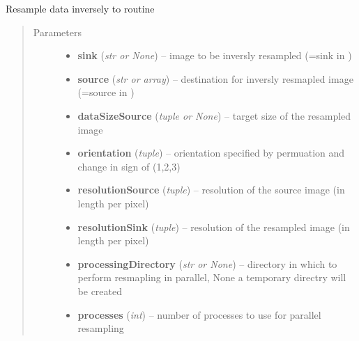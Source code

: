 \documentclass[letterpaper,10pt,english]{sphinxmanual}
\begin{document}
\begin{fulllineitems}
\label{api/ClearMap.Alignment:ClearMap.Alignment.Resampling.resampleDataInverse}
Resample data inversely to {\hyperref[api/ClearMap.Alignment:ClearMap.Alignment.Resampling.resampleData]{\emph{}}} routine
\begin{quote}\begin{description}
\item[{Parameters}] \leavevmode\begin{itemize}
\item {} 
\textbf{sink} (\emph{str or None}) --
image to be inversly resampled (=sink in {\hyperref[api/ClearMap.Alignment:ClearMap.Alignment.Resampling.resampleData]{\emph{}}})

\item {} 
\textbf{source} (\emph{str or array}) --
destination for inversly resmapled image (=source in {\hyperref[api/ClearMap.Alignment:ClearMap.Alignment.Resampling.resampleData]{\emph{}}})

\item {} 
\textbf{dataSizeSource} (\emph{tuple or None}) --
target size of the resampled image

\item {} 
\textbf{orientation} (\emph{tuple}) --
orientation specified by permuation and change in sign of (1,2,3)

\item {} 
\textbf{resolutionSource} (\emph{tuple}) --
resolution of the source image (in length per pixel)

\item {} 
\textbf{resolutionSink} (\emph{tuple}) --
resolution of the resampled image (in length per pixel)

\item {} 
\textbf{processingDirectory} (\emph{str or None}) --
directory in which to perform resmapling in parallel, None a temporary directry will be created

\item {} 
\textbf{processes} (\emph{int}) --
number of processes to use for parallel resampling


\end{itemize}
\end{description}
\end{quote}
\end{fulllineitems}
\end{document}
